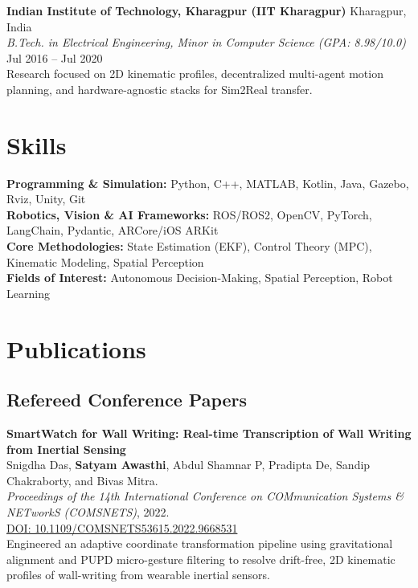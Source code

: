 \documentclass[10pt,letterpaper]{article}
\begin{document}
\noindent
\textbf{Indian Institute of Technology, Kharagpur (IIT Kharagpur)} \hfill Kharagpur, India \\
\textit{B.Tech. in Electrical Engineering, Minor in Computer Science (GPA: 8.98/10.0)} \hfill Jul 2016 – Jul 2020 \\
Research focused on 2D kinematic profiles, decentralized multi-agent motion planning, and hardware-agnostic stacks for Sim2Real transfer.

\section*{Skills}
\noindent \textbf{Programming \& Simulation:} Python, C++, MATLAB, Kotlin, Java, Gazebo, Rviz, Unity, Git \\
\noindent \textbf{Robotics, Vision \& AI Frameworks:} ROS/ROS2, OpenCV, PyTorch, LangChain, Pydantic, ARCore/iOS ARKit \\
\noindent \textbf{Core Methodologies:} State Estimation (EKF), Control Theory (MPC), Kinematic Modeling, Spatial Perception \\
\noindent \textbf{Fields of Interest:} Autonomous Decision-Making, Spatial Perception, Robot Learning

\section*{Publications}

\subsection*{Refereed Conference Papers}

\noindent \textbf{SmartWatch for Wall Writing: Real-time Transcription of Wall Writing from Inertial Sensing} \\
Snigdha Das, \textbf{Satyam Awasthi}, Abdul Shamnar P, Pradipta De, Sandip Chakraborty, and Bivas Mitra. \\
\textit{Proceedings of the 14th International Conference on COMmunication Systems \& NETworkS (COMSNETS)}, 2022. \\
\href{https://doi.org/10.1109/COMSNETS53615.2022.9668531}{\color{accent}\footnotesize DOI: 10.1109/COMSNETS53615.2022.9668531} \\
Engineered an adaptive coordinate transformation pipeline using gravitational alignment and PUPD micro-gesture filtering to resolve drift-free, 2D kinematic profiles of wall-writing from wearable inertial sensors.
\end{document}
